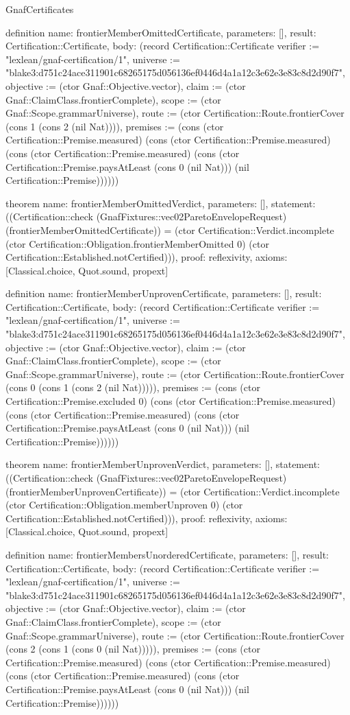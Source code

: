 \begin{lexlean}{GnafCertificates}
\begin{semanticmodule}
definition{
  name: frontierMemberOmittedCertificate,
  parameters: [],
  result: Certification::Certificate,
  body: (record Certification::Certificate {verifier := "lexlean/gnaf-certification/1", universe := "blake3:d751c24ace311901c68265175d056136ef0446d4a1a12c3e62e3e83c8d2d90f7", objective := (ctor Gnaf::Objective.vector), claim := (ctor Gnaf::ClaimClass.frontierComplete), scope := (ctor Gnaf::Scope.grammarUniverse), route := (ctor Certification::Route.frontierCover (cons 1 (cons 2 (nil Nat)))), premises := (cons (ctor Certification::Premise.measured) (cons (ctor Certification::Premise.measured) (cons (ctor Certification::Premise.measured) (cons (ctor Certification::Premise.paysAtLeast (cons 0 (nil Nat))) (nil Certification::Premise)))))})
}

theorem{
  name: frontierMemberOmittedVerdict,
  parameters: [],
  statement: ((Certification::check (GnafFixtures::vec02ParetoEnvelopeRequest) (frontierMemberOmittedCertificate)) = (ctor Certification::Verdict.incomplete (ctor Certification::Obligation.frontierMemberOmitted 0) (ctor Certification::Established.notCertified))),
  proof: reflexivity{},
  axioms: [Classical.choice, Quot.sound, propext]
}

definition{
  name: frontierMemberUnprovenCertificate,
  parameters: [],
  result: Certification::Certificate,
  body: (record Certification::Certificate {verifier := "lexlean/gnaf-certification/1", universe := "blake3:d751c24ace311901c68265175d056136ef0446d4a1a12c3e62e3e83c8d2d90f7", objective := (ctor Gnaf::Objective.vector), claim := (ctor Gnaf::ClaimClass.frontierComplete), scope := (ctor Gnaf::Scope.grammarUniverse), route := (ctor Certification::Route.frontierCover (cons 0 (cons 1 (cons 2 (nil Nat))))), premises := (cons (ctor Certification::Premise.excluded 0) (cons (ctor Certification::Premise.measured) (cons (ctor Certification::Premise.measured) (cons (ctor Certification::Premise.paysAtLeast (cons 0 (nil Nat))) (nil Certification::Premise)))))})
}

theorem{
  name: frontierMemberUnprovenVerdict,
  parameters: [],
  statement: ((Certification::check (GnafFixtures::vec02ParetoEnvelopeRequest) (frontierMemberUnprovenCertificate)) = (ctor Certification::Verdict.incomplete (ctor Certification::Obligation.memberUnproven 0) (ctor Certification::Established.notCertified))),
  proof: reflexivity{},
  axioms: [Classical.choice, Quot.sound, propext]
}

definition{
  name: frontierMembersUnorderedCertificate,
  parameters: [],
  result: Certification::Certificate,
  body: (record Certification::Certificate {verifier := "lexlean/gnaf-certification/1", universe := "blake3:d751c24ace311901c68265175d056136ef0446d4a1a12c3e62e3e83c8d2d90f7", objective := (ctor Gnaf::Objective.vector), claim := (ctor Gnaf::ClaimClass.frontierComplete), scope := (ctor Gnaf::Scope.grammarUniverse), route := (ctor Certification::Route.frontierCover (cons 2 (cons 1 (cons 0 (nil Nat))))), premises := (cons (ctor Certification::Premise.measured) (cons (ctor Certification::Premise.measured) (cons (ctor Certification::Premise.measured) (cons (ctor Certification::Premise.paysAtLeast (cons 0 (nil Nat))) (nil Certification::Premise)))))})
}


\end{semanticmodule}
\end{lexlean}
